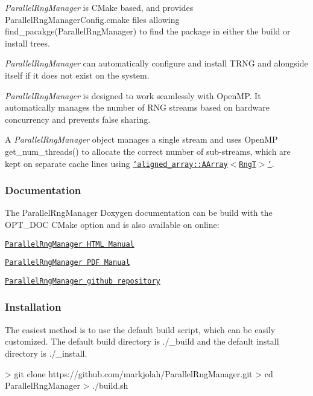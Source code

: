 \begin{DoxyItemize}
\item {\itshape Parallel\-Rng\-Manager} is C\-Make based, and provides {\ttfamily Parallel\-Rng\-Manager\-Config.\-cmake} files allowing {\ttfamily find\-\_\-pacakge(\-Parallel\-Rng\-Manager)} to find the package in either the build or install trees.
\item {\itshape Parallel\-Rng\-Manager} can automatically configure and install T\-R\-N\-G and alongside itself if it does not exist on the system.
\item {\itshape Parallel\-Rng\-Manager} is designed to work seamlessly with Open\-M\-P. It automatically manages the number of R\-N\-G streams based on hardware concurrency and prevents false sharing.
\item A {\itshape Parallel\-Rng\-Manager} object manages a single stream and uses Open\-M\-P {\ttfamily get\-\_\-num\-\_\-threads()} to allocate the correct number of sub-\/streams, which are kept on separate cache lines using \href{https://github.com/markjolah/AlignedArray}{\tt `aligned\-\_\-array\-::\-A\-Array$<$\-Rng\-T$>$`}.
\end{DoxyItemize}

\subsubsection*{Documentation}

The Parallel\-Rng\-Manager Doxygen documentation can be build with the {\ttfamily O\-P\-T\-\_\-\-D\-O\-C} C\-Make option and is also available on online\-:
\begin{DoxyItemize}
\item \href{https://markjolah.github.io/ParallelRngManager/index.html}{\tt Parallel\-Rng\-Manager H\-T\-M\-L Manual}
\item \href{https://markjolah.github.io/ParallelRngManager/pdf/ParallelRngManager-0.3-reference.pdf}{\tt Parallel\-Rng\-Manager P\-D\-F Manual}
\item \href{https://github.com/markjolah/ParallelRngManager}{\tt Parallel\-Rng\-Manager github repository}
\end{DoxyItemize}

\subsubsection*{Installation}

The easiest method is to use the default build script, which can be easily customized. The default build directory is {\ttfamily ./\-\_\-build} and the default install directory is {\ttfamily ./\-\_\-install}. \begin{DoxyVerb}> git clone https://github.com/markjolah/ParallelRngManager.git
> cd ParallelRngManager
> ./build.sh
\end{DoxyVerb}


